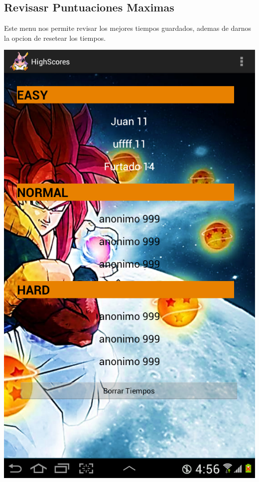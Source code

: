 \documentclass[11pt]{article} %
\begin{document}
\subsection{Revisasr Puntuaciones Maximas}
Este menu nos permite revisar los mejores tiempos guardados, ademas de darnos la opcion de resetear los tiempos.
\begin{center}
\includegraphics[scale=0.2]{Imagenes/SSHighScores.png}
\end{center}
\end{document}
